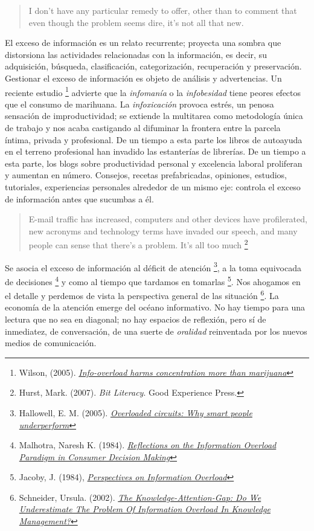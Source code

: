 \documentclass[12pt, a4paper,twoside]{book}
\begin{document}
\begin{quote}
I don't have any particular remedy to offer, other than to comment
that even though the problem seems dire, it's not all that new.

\end{quote}
El exceso de información es un relato recurrente; proyecta una
sombra que distorsiona las actividades relacionadas con la
información, es decir, su adquisición, búsqueda, clasificación,
categorización, recuperación y preservación. Gestionar el exceso de
información es objeto de análisis y advertencias. Un reciente
estudio%
\footnote{Wilson, (2005).
\emph{\href{http://www.newscientist.com/article/mg18624973.400}{Info-overload harms concentration more than marijuana}}}
advierte que la \emph{infomanía} o la \emph{infobesidad} tiene
peores efectos que el consumo de marihuana. La \emph{infoxicación}
provoca estrés, un penosa sensación de improductividad; se extiende
la multitarea como metodología única de trabajo y nos acaba
castigando al difuminar la frontera entre la parcela íntima,
privada y profesional. De un tiempo a esta parte los libros de
autoayuda en el terreno profesional han invadido las estanterías de
librerías. De un tiempo a esta parte, los blogs sobre productividad
personal y excelencia laboral proliferan y aumentan en número.
Consejos, recetas prefabricadas, opiniones, estudios, tutoriales,
experiencias personales alrededor de un mismo eje: controla el
exceso de información antes que sucumbas a él.

\begin{quote}
E-mail traffic has increased, computers and other devices have
profilerated, new acronyms and technology terms have invaded our
speech, and many people can sense that there's a problem. It's all
too much%
\footnote{Hurst, Mark. (2007). \emph{Bit Literacy}. Good Experience Press.}

\end{quote}
Se asocia el exceso de información al déficit de atención%
\footnote{Hallowell, E. M. (2005).
\emph{\href{http://tr.im/wSsS}{Overloaded circuits: Why smart people underperform}}},
a la toma equivocada de decisiones%
\footnote{Malhotra, Naresh K. (1984).
\emph{\href{http://www.jstor.org/pss/2488913}{Reflections on the Information Overload Paradigm in Consumer Decision Making}}}
y como al tiempo que tardamos en tomarlas%
\footnote{Jacoby, J. (1984),
\emph{\href{http://www.jstor.org/pss/2488912}{Perspectives on Information Overload}}}.
Nos ahogamos en el detalle y perdemos de vista la perspectiva
general de las situación%
\footnote{Schneider, Ursula. (2002).
\emph{\href{http://www.jucs.org/jucs_8_5/the_knowledge_attention_gap/Schneider_U.html}{The Knowledge-Attention-Gap: Do We Underestimate The Problem Of Information Overload In Knowledge Management?}}}.
La economía de la atención emerge del océano informativo. No hay
tiempo para una lectura que no sea en diagonal; no hay espacios de
reflexión, pero sí de inmediatez, de conversación, de una suerte de
\emph{oralidad} reinventada por los nuevos medios de comunicación.
\end{document}
